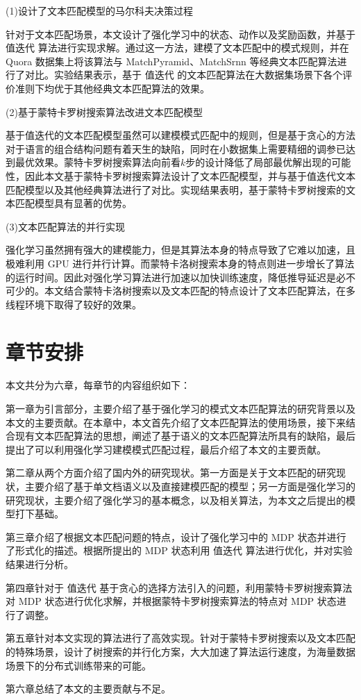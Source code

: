 (1)设计了文本匹配模型的马尔科夫决策过程

针对于文本匹配场景，本文设计了强化学习中的状态、动作以及奖励函数，并基于 值迭代 算法进行实现求解。通过这一方法，建模了文本匹配中的模式规则，并在 Quora 数据集上将该算法与 MatchPyramid、MatchSrnn 等经典文本匹配算法进行了对比。实验结果表示，基于 值迭代 的文本匹配算法在大数据集场景下各个评价准则下均优于其他经典文本匹配算法的效果。

(2)基于蒙特卡罗树搜索算法改进文本匹配模型

基于值迭代的文本匹配模型虽然可以建模模式匹配中的规则，但是基于贪心的方法对于语言的组合结构问题有着天生的缺陷，同时在小数据集上需要精细的调参已达到最优效果。蒙特卡罗树搜索算法向前看$k$步的设计降低了局部最优解出现的可能性，因此本文基于蒙特卡罗树搜索算法设计了文本匹配模型，并与基于值迭代文本匹配模型以及其他经典算法进行了对比。实现结果表明，基于蒙特卡罗树搜索的文本匹配模型具有显著的优势。

(3)文本匹配算法的并行实现

强化学习虽然拥有强大的建模能力，但是其算法本身的特点导致了它难以加速，且极难利用 GPU 进行并行计算。而蒙特卡洛树搜索本身的特点则进一步增长了算法的运行时间。因此对强化学习算法进行加速以加快训练速度，降低推导延迟是必不可少的。本文结合蒙特卡洛树搜索以及文本匹配的特点设计了文本匹配算法，在多线程环境下取得了较好的效果。

\section{章节安排}
本文共分为六章，每章节的内容组织如下：

第一章为引言部分，主要介绍了基于强化学习的模式文本匹配算法的研究背景以及本文的主要贡献。在本章中，本文首先介绍了文本匹配算法的使用场景，接下来结合现有文本匹配算法的思想，阐述了基于语义的文本匹配算法所具有的缺陷，最后提出了可以利用强化学习建模模式匹配过程，最后介绍了本文的主要贡献。

第二章从两个方面介绍了国内外的研究现状。第一方面是关于文本匹配的研究现状，主要介绍了基于单文档语义以及直接建模匹配的模型；另一方面是强化学习的研究现状，主要介绍了强化学习的基本概念，以及相关算法，为本文之后提出的模型打下基础。

第三章介绍了根据文本匹配问题的特点，设计了强化学习中的 MDP 状态并进行了形式化的描述。根据所提出的 MDP 状态利用 值迭代 算法进行优化，并对实验结果进行分析。

第四章针对于 值迭代 基于贪心的选择方法引入的问题，利用蒙特卡罗树搜索算法对 MDP 状态进行优化求解，并根据蒙特卡罗树搜索算法的特点对 MDP 状态进行了调整。

第五章针对本文实现的算法进行了高效实现。针对于蒙特卡罗树搜索以及文本匹配的特殊场景，设计了树搜索的并行化方案，大大加速了算法运行速度，为海量数据场景下的分布式训练带来的可能。

第六章总结了本文的主要贡献与不足。

